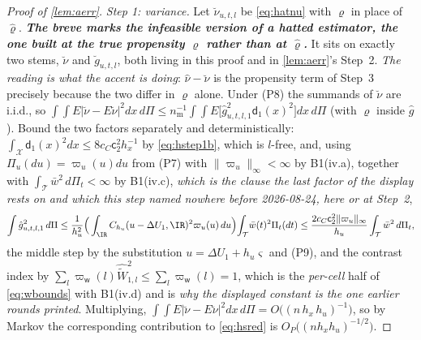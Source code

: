 \begin{proof}[Proof of \cref{lem:aerr}]
\emph{Step 1: variance.} Let $\breve\nu_{u,t,l}$ be \eqref{eq:hatnu} with $\varrho$ in place of
$\hat\varrho$.
\emph{\textbf{The breve marks the \emph{infeasible} version of a hatted estimator, the one built at
the true propensity $\varrho$ rather than at $\hat\varrho$.}} It sits on exactly two stems, $\breve\nu$
and $\breve g_{u,t,l}$, both living in this proof and in \cref{lem:aerr}'s Step~2. \emph{The reading is
what the accent is doing}: $\hat\nu-\breve\nu$ is the propensity term of Step~3 precisely because the
two differ in $\varrho$ alone.
Under (P8) the summands of $\breve\nu$ are i.i.d., so
$\int\!\int E|\breve\nu-E\breve\nu|^{2}dx\,d\Pi
\le n_{\mathrm m}^{-1}\int\!\int E\big[\hat g_{u,t,l,1}^{2}\mathsf d_1(x)^{2}\big]dx\,d\Pi$
(with $\varrho$ inside $\hat g$). Bound the two factors separately and deterministically:
$\int_{\mathcal X}\mathsf d_1(x)^{2}dx\le8c_C\mathsf c_2^{2}h_x^{-1}$ by \eqref{eq:hstep1b},
which is $l$-free, and, using $\Pi_u(du)=\varpi_u(u)du$ from (P7) with
$\|\varpi_u\|_\infty<\infty$ by B1(iv.a), together with $\int_{\mathcal T}\bar w^{2}\,d\Pi_t<\infty$ by
B1(iv.c), \emph{which is the clause the last factor of the display rests on and which this step named
nowhere before 2026-08-24, here or at Step~2},
\[
\int\hat g_{u,t,l,1}^{2}\,d\Pi
\le\frac{1}{h_u^{2}}\Big(\int_\IR C_{h_u}(u-\Delta U_1,\IR)^{2}\varpi_u(u)\,du\Big)\!\int_{\mathcal T}\!\bar w(t)^{2}\Pi_t(dt)
\le\frac{2c_C\mathsf c_2^{2}\|\varpi_u\|_\infty}{h_u}\int_{\mathcal T}\bar w^{2}\,d\Pi_t ,
\]
the middle step by the substitution $u=\Delta U_1+h_u\varsigma$ and (P9), and the contrast index by
$\sum_l\varpi_{\mathsf w}(l)\widehat{\widetilde W}_{1,l}^{2}\le\sum_l\varpi_{\mathsf w}(l)=1$, which is
the \emph{per-cell} half of \eqref{eq:wbounds} with B1(iv.d) and is \emph{why the displayed constant is
the one earlier rounds printed}. Multiplying,
$\int\!\int E|\breve\nu-E\breve\nu|^{2}dx\,d\Pi=O\big((n\,h_x\,h_u)^{-1}\big)$, so by Markov the
corresponding contribution to \eqref{eq:hsred} is $O_P\big((nh_xh_u)^{-1/2}\big)$.


\end{proof}
